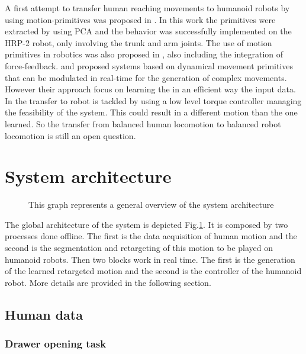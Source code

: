 A first attempt to transfer human reaching movements to humanoid robots by using motion-primitives was proposed in
\cite{ref:ttsg13}. In this work the primitives were extracted by using PCA and the behavior was successfully
implemented on the HRP-2 robot, only involving the trunk and arm joints.
The use of motion primitives in robotics
was also proposed in \cite{ref:gnzwiau13}, also including the integration of force-feedback.
\cite{ref:inhps13} and \cite{ajallooeian_general_2013} proposed systems based on dynamical movement primitives that
can be  modulated in real-time for the generation of complex movements.
However their approach focus on learning the in an efficient way the input data.
In \cite{ref:inhps13} the transfer to robot is tackled by using a low level torque controller managing the feasibility of the system.
This could result in a different motion than the one learned.
So the transfer from balanced human locomotion to balanced robot locomotion is still an open question.

\section{System architecture}
\label{sc:SystemArchitecture}

\begin{figure}[ht]
\centering

\caption{This graph represents a general overview of the system architecture}
\label{fig:archi:general}
\end{figure}

The global architecture of the system is depicted Fig.\ref{fig:archi:general}.
It is composed by two processes done offline.
The first is the data acquisition of human motion and the second is the segmentation and retargeting of this motion to be played on humanoid robots.
Then two blocks work in real time.
The first is the generation of the learned retargeted motion and the second is the controller of the humanoid robot.
More details are provided in the following section.

\subsection{Human data}
\label{subsec:modeling}

\subsubsection*{Drawer opening task}

